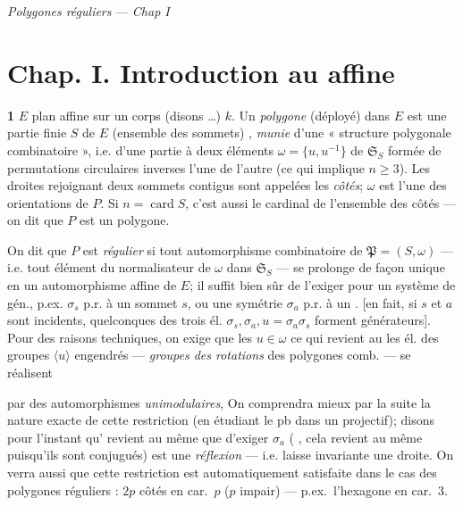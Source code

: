 \documentclass[11pt,a4paper]{article}
\begin{document}
\textit{Polygones réguliers} — \textit{Chap I}

\section{Chap. I. Introduction au  affine}


\textbf{1} 
$E$ plan affine sur un corps (disons …) $k$. Un \struck{\ill{}} \emph{polygone}
(déployé) dans $E$ est une partie finie $S$ de $E$ (ensemble des sommets)
, \emph{munie} d'une « structure polygonale
combinatoire », i.e. d'une partie à deux éléments $\omega = \{u, u^{-1}\}$ de
$\mathfrak{S}_S$ formée de permutations circulaires inverses l'une de l'autre
(ce qui implique $n \geq 3$). Les droites rejoignant deux sommets contigus sont
appelées  les \emph{côtés}; $\omega$
est l'une des orientations de $P$. Si $n = \operatorname{card} S$, c'est aussi
le cardinal de l'ensemble des côtés — on dit que $P$ est un
polygone.

On dit que $P$ est \emph{régulier} si tout automorphisme combinatoire de
$\mathfrak{P} = (S, \omega)$ — i.e. tout élément du normalisateur
 de $\omega$ dans $\mathfrak{S}_S$ — se prolonge de façon
unique en un automorphisme affine de $E$; il suffit bien sûr de l'exiger
 \struck{\ill{}} pour un système de gén., p.ex.
 $\sigma_s$ p.r. à un sommet $s$, ou une symétrie
$\sigma_a$ p.r. à un \struck{\ill{}} . [en fait, si $s$ et $a$ sont
incidents,  quelconques des trois él. $\sigma_s, \sigma_a,
u = \sigma_a \sigma_s$ forment   générateurs].
Pour des raisons techniques, on exige que les $u \in \omega$ \ill{} \ill{} ce
qui revient au \ill{} les él. des groupes  $\langle u \rangle$
engendrés —  \emph{groupes des rotations} des polygones
comb. — se réalisent

par des automorphismes \emph{unimodulaires}, \struck{\ill{}} On comprendra
mieux par la suite la nature exacte de cette restriction (en étudiant le pb
dans un projectif); disons pour l'instant qu'  revient au
même que d'exiger $\sigma_a$ (\ill{} \ill{}, cela revient au même puisqu'ils
sont conjugués) est une \emph{réflexion} — i.e. laisse invariante une droite.
On verra aussi que cette restriction est automatiquement satisfaite dans le
cas des polygones réguliers \ill{} : $2p$ côtés en car.\ $p$ ($p$
 impair) — p.ex.\ l'hexagone en car.\ 3.
\end{document}

